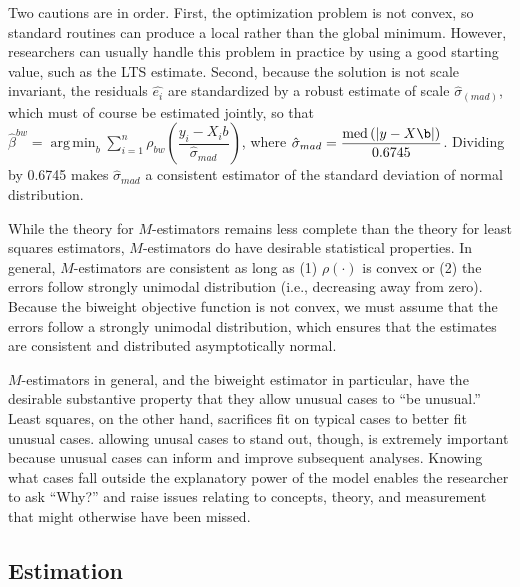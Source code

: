 \documentclass[12pt]{article}
\DeclareMathOperator*{\argmin}{arg\,min}
\DeclareMathOperator{\med}{med}
\begin{document}
Two cautions are in order. 
First, the optimization problem is not convex, so standard routines can produce a local rather than the global minimum. 
However, researchers can usually handle this problem in practice by using a good starting value, such as the LTS estimate. 
Second, because the solution is not scale invariant, the residuals $\hat{e_i}$ are standardized by a robust estimate of scale $\hat{\sigma}_{(mad)}$, which must of course be estimated jointly, so that $\hat{\beta}^{bw} =\argmin_{b} \sum_{i = 1}^n \rho_{bw}\left(\dfrac{y_i - X_ib}{\hat{\sigma}_{mad}}\right)$, where $\hat{\sigma}_{mad} = \dfrac{\med\left( |y - X\b|\right)}{0.6745}$. 
Dividing by 0.6745 makes $\hat{\sigma}_{mad}$ a consistent estimator of the standard deviation of normal distribution.

While the theory for $M$-estimators remains less complete than the theory for least squares estimators, $M$-estimators do have desirable statistical properties. 
In general, $M$-estimators are consistent as long as (1) $\rho(\cdot)$ is convex or (2) the errors follow strongly unimodal distribution (i.e., decreasing away from zero). 
Because the biweight objective function is not convex, we must assume that the errors follow a strongly unimodal distribution, which ensures that the estimates are consistent and distributed asymptotically normal.

$M$-estimators in general, and the biweight estimator in particular, have the desirable substantive property that they allow unusual cases to ``be unusual.''
Least squares, on the other hand, sacrifices fit on typical cases to better fit unusual cases. 
allowing unusal cases to stand out, though, is extremely important because unusual cases can inform and improve subsequent analyses. 
Knowing what cases fall outside the explanatory power of the model enables the researcher to ask ``Why?'' and raise issues relating to concepts, theory, and measurement that might otherwise have been missed.

\subsection*{Estimation}
\end{document}
